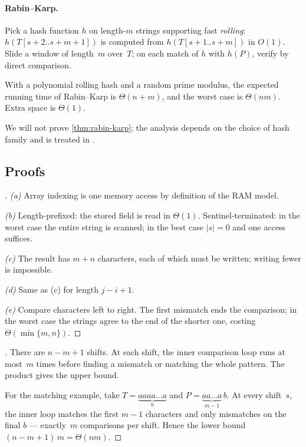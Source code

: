 \paragraph{Rabin--Karp.} Pick a hash function $h$ on length-$m$
strings supporting fast \emph{rolling}: $h(T[s+2..s+m+1])$ is computed
from $h(T[s+1..s+m])$ in $O(1)$. Slide a window of length~$m$ over~$T$;
on each match of $h$ with $h(P)$, verify by direct comparison.

\begin{theorem}
\label{thm:rabin-karp}
With a polynomial rolling hash and a random prime modulus, the
expected running time of Rabin--Karp is $\Theta(n + m)$, and the
worst case is $\Theta(nm)$. Extra space is $\Theta(1)$.
\end{theorem}

We will not prove \cref{thm:rabin-karp}; the analysis depends on
the choice of hash family and is treated in
\cite[\S~32.2]{CLRS2013}.

\subsection*{Proofs}

\begin{proof}[]
\emph{(a)} Array indexing is one memory access by definition of the
RAM model.

\emph{(b)} Length-prefixed: the stored field is read in $\Theta(1)$.
Sentinel-terminated: in the worst case the entire string is scanned;
in the best case $|s| = 0$ and one access suffices.

\emph{(c)} The result has $m + n$ characters, each of which must be
written; writing fewer is impossible.

\emph{(d)} Same as (c) for length $j - i + 1$.

\emph{(e)} Compare characters left to right. The first mismatch ends
the comparison; in the worst case the strings agree to the end of the
shorter one, costing $\Theta(\min\{m, n\})$.
\end{proof}

\begin{proof}[]
There are $n - m + 1$ shifts. At each shift, the inner comparison
loop runs at most~$m$ times before finding a mismatch or matching the
whole pattern. The product gives the upper bound.

For the matching example, take $T = \underbrace{aaaa\dots a}_{n}$ and
$P = \underbrace{aa\dots a}_{m - 1}\, b$. At every shift~$s$, the
inner loop matches the first $m - 1$ characters and only mismatches
on the final $b$ — exactly~$m$ comparisons per shift. Hence the lower
bound $(n - m + 1)\, m = \Theta(nm)$.
\end{proof}

